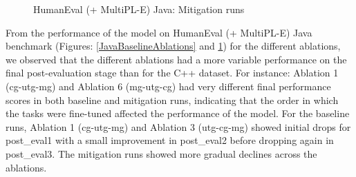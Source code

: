 \begin{figure}[H]
\begin{minipage}{0.45\textwidth}
        \captionsetup{width=1.1\textwidth}
        \caption{HumanEval (+ MultiPL-E) Java: Mitigation runs}
        \label{JavaMitigationAblations}
    \end{minipage}
\end{figure}
From the performance of the model on HumanEval (+ MultiPL-E) Java benchmark (Figures: \ref{JavaBaselineAblations} and \ref{JavaMitigationAblations}) for the different ablations, we observed that the different ablations had a more variable performance on the final post-evaluation stage than for the C++ dataset. For instance: Ablation 1 (cg-utg-mg) and Ablation 6 (mg-utg-cg) had very different final performance scores in both baseline and mitigation runs, indicating that the order in which the tasks were fine-tuned affected the performance of the model. For the baseline runs, Ablation 1 (cg-utg-mg) and Ablation 3 (utg-cg-mg) showed initial drops for post\_eval1 with a small improvement in post\_eval2 before dropping again in post\_eval3. The mitigation runs showed more gradual declines across the ablations.

